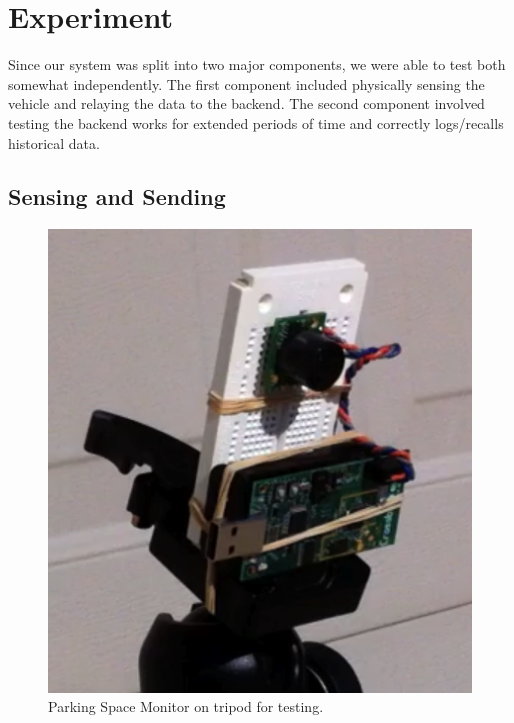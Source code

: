 \documentclass{acm_proc}
\begin{document}
\section{Experiment}\label{sec:experiment}

Since our system was split into two major components, we were able to test
both somewhat independently. 
The first component included physically sensing the vehicle and relaying
the data to the backend.
The second component involved testing the backend works for extended
periods of time and correctly logs/recalls historical data.

\subsection{Sensing and Sending}

\begin{figure}
    \begin{center}
		\includegraphics[width=\columnwidth]{figures/parking_sensor}
	\end{center}
	\caption{Parking Space Monitor on tripod for testing.}
	\label{fig:parking_sensor}
\end{figure}
\end{document}
